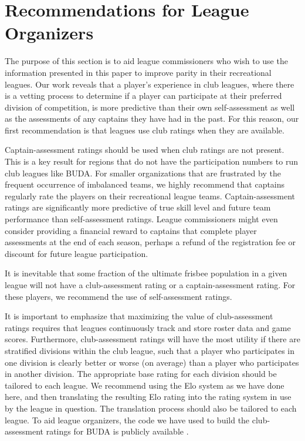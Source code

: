 \section{Recommendations for League Organizers}\label{sec:recommendations}

The purpose of this section is to aid league commissioners who wish to use the information presented in this paper to improve parity in their recreational leagues. Our work reveals that a player's experience in club leagues, where there is a vetting process to determine if a player can participate at their preferred division of competition, is more predictive than their own self-assessment as well as the assessments of any captains they have had in the past. For this reason, our first recommendation is that leagues use club ratings when they are available. 

Captain-assessment ratings should be used when club ratings are not present. This is a key result for regions that do not have the participation numbers to run club leagues like BUDA. For smaller organizations that are frustrated by the frequent occurrence of imbalanced teams, we highly recommend that captains regularly rate the players on their recreational league teams. Captain-assessment ratings are significantly more predictive of true skill level and future team performance than self-assessment ratings. League commissioners might even consider providing a financial reward to captains that complete player assessments at the end of each season, perhaps a refund of the registration fee or discount for future league participation. 

It is inevitable that some fraction of the ultimate frisbee population in a given league will not have a club-assessment rating or a captain-assessment rating. For these players, we recommend the use of self-assessment ratings.

It is important to emphasize that maximizing the value of club-assessment ratings requires that leagues continuously track and store roster data and game scores. Furthermore, club-assessment ratings will have the most utility if there are stratified divisions within the club league, such that a player who participates in one division is clearly better or worse (on average) than a player who participates in another division. The appropriate base rating for each division should be tailored to each league. We recommend using the Elo system as we have done here, and then translating the resulting Elo rating into the rating system in use by the league in question. The translation process should also be tailored to each league. To aid league organizers, the code we have used to build the club-assessment ratings for BUDA is publicly available \cite{shanegit}.